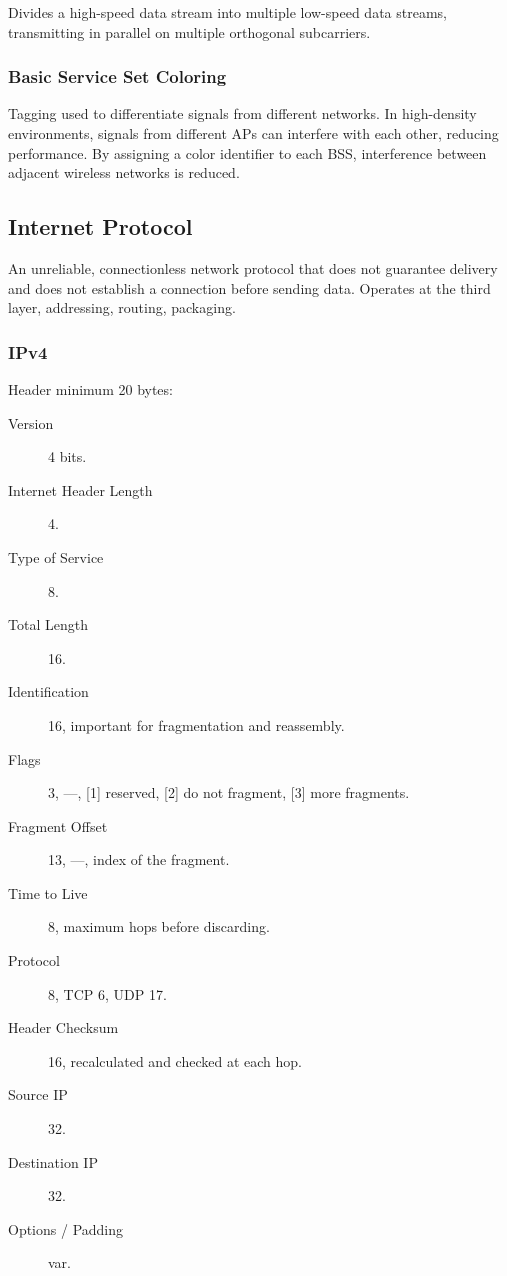\documentclass[11pt,journal,compsoc]{IEEEtran}
\begin{document}
Divides a high-speed data stream into multiple low-speed data streams, transmitting in parallel on multiple orthogonal subcarriers.

\subsubsection{Basic Service Set Coloring}

Tagging used to differentiate signals from different networks. In high-density environments, signals from different APs can interfere with each other, reducing performance. By assigning a color identifier to each BSS, interference between adjacent wireless networks is reduced.

\subsection{Internet Protocol}

An unreliable, connectionless network protocol that does not guarantee delivery and does not establish a connection before sending data. Operates at the third layer, addressing, routing, packaging.

\subsubsection{IPv4}

Header minimum 20 bytes:

\begin{description}
    \item[Version] 4 bits.
    
    \item[Internet Header Length] 4.
    
    \item[Type of Service] 8.
    
    \item[Total Length] 16.
    
    \item[Identification] 16, important for fragmentation and reassembly.
    
    \item[Flags] 3, —, [1] reserved, [2] do not fragment, [3] more fragments.
    
    \item[Fragment Offset] 13, —, index of the fragment.
    
    \item[Time to Live] 8, maximum hops before discarding.
    
    \item[Protocol] 8, TCP 6, UDP 17.
    
    \item[Header Checksum] 16, recalculated and checked at each hop.
    
    \item[Source IP] 32.
    
    \item[Destination IP] 32.
    
    \item[Options / Padding] var.
\end{description}
\end{document}
